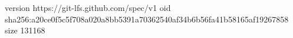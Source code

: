 version https://git-lfs.github.com/spec/v1
oid sha256:a20ce0f5c5f708a020a8bb5391a70362540af34b6b56fa41b58165af19267858
size 131168
